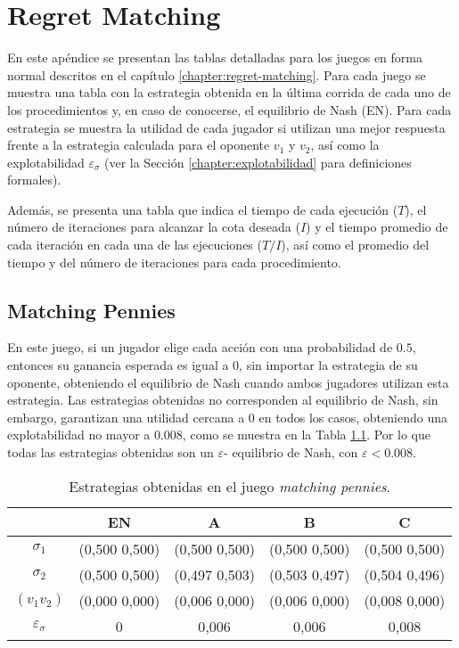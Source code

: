 \chapter{Regret Matching}
\label{apex:chapter:experimentos-rm}

En este apéndice se presentan las tablas detalladas para los juegos en forma normal descritos en el capítulo \ref{chapter:regret-matching}. Para cada juego se muestra una tabla con la estrategia obtenida en la última corrida de cada uno de los procedimientos y, en caso de conocerse, el equilibrio de Nash (EN). Para cada estrategia se muestra la utilidad de cada jugador si utilizan una mejor respuesta frente a la estrategia calculada para el oponente $v_1$ y $v_2$, así como la explotabilidad $\varepsilon_{\sigma}$ (ver la Sección \ref{chapter:explotabilidad} para definiciones formales).

Además, se presenta una tabla que indica el tiempo de cada ejecución ($T$), el número de iteraciones para alcanzar la cota deseada ($I$) y el tiempo promedio de cada iteración en cada una de las ejecuciones ($T/I$), así como el promedio del tiempo y del número de iteraciones para cada procedimiento.


\section*{Matching Pennies}

En este juego, si un jugador elige cada acción con una probabilidad de $0.5$, entonces su ganancia esperada es igual a $0$, sin importar la estrategia de su oponente, obteniendo el equilibrio de Nash cuando ambos jugadores utilizan esta estrategia. Las estrategias obtenidas no corresponden al equilibrio de Nash, sin embargo, garantizan una utilidad cercana a $0$ en todos los casos, obteniendo una explotabilidad no mayor a $0.008$, como se muestra en la Tabla \ref{tab:estrategias-matching-pennies}. Por lo que todas las estrategias obtenidas son un $\varepsilon$- equilibrio de Nash, con $\varepsilon < 0.008$.

\begin{table}[h]
    \centering
    \caption{Estrategias obtenidas en el juego \textit{matching pennies}.}
    \label{tab:estrategias-matching-pennies}
    \begin{tabular}{c c c c c}
    \toprule
        & EN & A & B & C \\ \midrule
        $\sigma_1$   & (0,500 0,500) & (0,500 0,500) & (0,500 0,500) & (0,500 0,500) \\
        $\sigma_2$   & (0,500 0,500) & (0,497 0,503) & (0,503 0,497) & (0,504 0,496) \\ 
        $(v_1  v_2)$ & (0,000 0,000) & (0,006 0,000) & (0,006 0,000) & (0,008 0,000) \\
        $\varepsilon_{\sigma}$ & 0 & 0,006 & 0,006 & 0,008 \\ \bottomrule
    \end{tabular}
\end{table}

